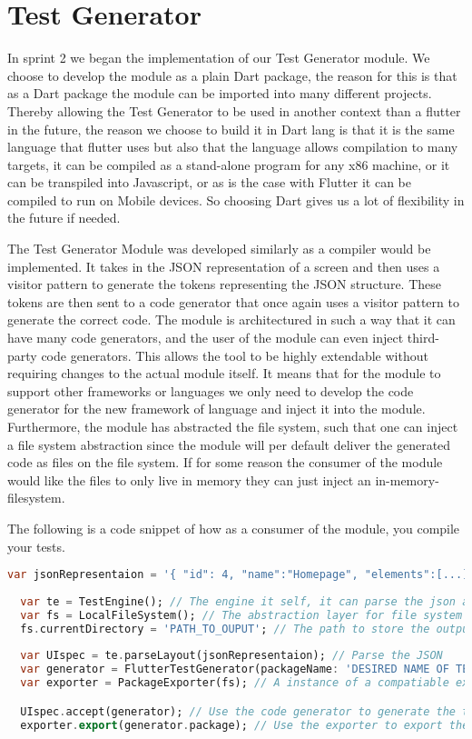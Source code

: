 \section{Test Generator}
In sprint 2 we began the implementation of our Test Generator module. 
We choose to develop the module as a plain Dart package, the reason for this is that as a Dart package the module can be imported into many different projects.
Thereby allowing the Test Generator to be used in another context than a flutter in the future, the reason we choose to build it in Dart lang is that it is the same language that flutter uses but also that the language allows compilation to many targets, it can be compiled as a stand-alone program for any x86 machine, or it can be transpiled into Javascript, or as is the case with Flutter it can be compiled to run on Mobile devices. 
So choosing Dart gives us a lot of flexibility in the future if needed.

The Test Generator Module was developed similarly as a compiler would be implemented.
It takes in the JSON representation of a screen and then uses a visitor pattern to generate the tokens representing the JSON structure.
These tokens are then sent to a code generator that once again uses a visitor pattern to generate the correct code.
The module is architectured in such a way that it can have many code generators, and the user of the module can even inject third-party code generators.
This allows the tool to be highly extendable without requiring changes to the actual module itself.
It means that for the module to support other frameworks or languages we only need to develop the code generator for the new framework of language and inject it into the module.
Furthermore, the module has abstracted the file system, such that one can inject a file system abstraction since the module will per default deliver the generated code as files on the file system. If for some reason the consumer of the module would like the files to only live in memory they can just inject an in-memory-filesystem.

The following is a code snippet of how as a consumer of the module, you compile your tests.

\begin{lstlisting}[language=dart]
  var jsonRepresentaion = '{ "id": 4, "name":"Homepage", "elements":[...]}'; //The output from the Mobile application
  
  var te = TestEngine(); // The engine it self, it can parse the json and use a codegenerator
  var fs = LocalFileSystem(); // The abstraction layer for file system
  fs.currentDirectory = 'PATH_TO_OUPUT'; // The path to store the output test suite
  
  var UIspec = te.parseLayout(jsonRepresentaion); // Parse the JSON
  var generator = FlutterTestGenerator(packageName: 'DESIRED NAME OF TEST PACKAGE'); // An instance of a compatiable code generator
  var exporter = PackageExporter(fs); // A instance of a compatiable exporter.

  UIspec.accept(generator); // Use the code generator to generate the test suite
  exporter.export(generator.package); // Use the exporter to export the test suite to the file system.
\end{lstlisting}

